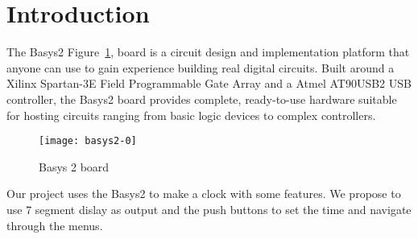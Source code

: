 \section{Introduction}

The Basys2 Figure~\ref{fig:Basys2}, board is a circuit design and implementation platform that anyone can use to gain experience building real digital circuits. Built around a Xilinx Spartan-3E Field Programmable Gate Array and a Atmel AT90USB2 USB controller, the Basys2 board provides complete, ready-to-use hardware suitable for hosting circuits ranging from basic logic devices to complex controllers.


\begin{figure}[!htbp]
    \centerline{\texttt{[image: basys2-0]}}
    \vspace{0cm}\caption{Basys 2 board}
    \label{fig:Basys2}
\end{figure}


Our project uses the Basys2 to make a clock with some features. We propose to use 7 segment dislay as output and the push buttons to set the time and navigate through the menus.

\noindent

